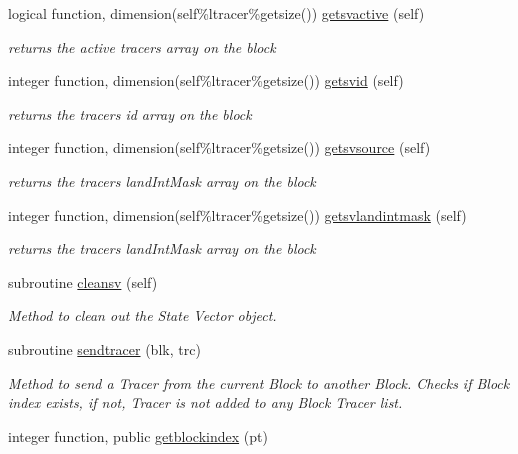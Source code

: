 \begin{DoxyCompactItemize}
logical function, dimension(self\%ltracer\%getsize()) \mbox{\hyperlink{namespaceblocks__mod_a2fdac72f343c10f38d1acb3f5779de18}{getsvactive}} (self)
\begin{DoxyCompactList}\small\item\em returns the active tracers array on the block \end{DoxyCompactList}\item 
integer function, dimension(self\%ltracer\%getsize()) \mbox{\hyperlink{namespaceblocks__mod_af9cfa830fff1b8986efba72fa4c82473}{getsvid}} (self)
\begin{DoxyCompactList}\small\item\em returns the tracers id array on the block \end{DoxyCompactList}\item 
integer function, dimension(self\%ltracer\%getsize()) \mbox{\hyperlink{namespaceblocks__mod_abd5099df59aeafdc3b318719dd4c8d20}{getsvsource}} (self)
\begin{DoxyCompactList}\small\item\em returns the tracers land\+Int\+Mask array on the block \end{DoxyCompactList}\item 
integer function, dimension(self\%ltracer\%getsize()) \mbox{\hyperlink{namespaceblocks__mod_a046c07d2d955655055d78e37b6e622ef}{getsvlandintmask}} (self)
\begin{DoxyCompactList}\small\item\em returns the tracers land\+Int\+Mask array on the block \end{DoxyCompactList}\item 
subroutine \mbox{\hyperlink{namespaceblocks__mod_ab70bfe5cdce5a717115cfbac04f606a0}{cleansv}} (self)
\begin{DoxyCompactList}\small\item\em Method to clean out the State Vector object. \end{DoxyCompactList}\item 
subroutine \mbox{\hyperlink{namespaceblocks__mod_a5a9992de40470e417ec8e40e688f6a0e}{sendtracer}} (blk, trc)
\begin{DoxyCompactList}\small\item\em Method to send a Tracer from the current Block to another Block. Checks if Block index exists, if not, Tracer is not added to any Block Tracer list. \end{DoxyCompactList}\item 
integer function, public \mbox{\hyperlink{namespaceblocks__mod_a62e8fb0d6b2535b4499c7a4d848c24ba}{getblockindex}} (pt)

\end{DoxyCompactItemize}
